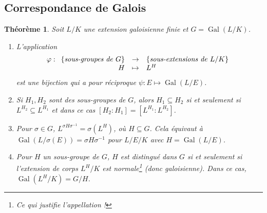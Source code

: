 \documentclass{article}
\DeclareMathOperator{\Gal}{Gal}
\newcommand{\applic}[4]{\begin{array}[t]{rcl}
#1 & \to & #2 \\
#3 & \mapsto & #4
\end{array}}
\theoremstyle{plain}
\newtheorem{theorem}{Théorème}[subsection]
\theoremstyle{definition}
\theoremstyle{remark}
\begin{document}
\subsection{Correspondance de Galois}

\begin{theorem}
    Soit $L/K$ une extension galoisienne finie et $G = \Gal(L/K)$.
    \begin{enumerate}
        \item L'application
        \[\varphi : \applic{\{\text{\emph{sous-groupes de} $G$}\}}{\{\text{\emph{sous-extensions de} $L/K$}\}}{H}{L^H}\]
        est une bijection qui a pour réciproque $\psi : E \mapsto \Gal(L/E)$.
        \item Si $H_1, H_2$ sont des sous-groupes de $G$, alors $H_1 \subseteq H_2$ si et seulement si $L^{H_2} \subseteq L^{H_1}$ et dans ce cas $[H_2 : H_1] = [L^{H_1} : L^{H_2}]$.
        \item Pour $\sigma \in G$, $L^{\sigma H \sigma^{-1}} = \sigma(L^H)$, où $H \subseteq G$. Cela équivaut à $\Gal(L/\sigma(E)) = \sigma H \sigma^{-1}$ pour $L/E/K$ avec $H = \Gal(L/E)$. 
        \item Pour $H$ un sous-groupe de $G$, $H$ est distingué dans $G$ si et seulement si l'extension de corps $L^H/K$ est normale\footnote{Ce qui justifie l'appellation !} (donc galoisienne). Dans ce cas, $\Gal(L^H/K) = G/H$.
    \end{enumerate}
\end{theorem}
\end{document}
